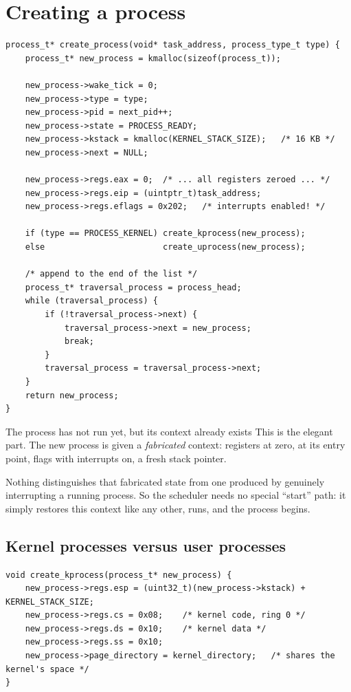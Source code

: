 \section{Creating a process}

\begin{lstlisting}[style=c]
process_t* create_process(void* task_address, process_type_t type) {
    process_t* new_process = kmalloc(sizeof(process_t));

    new_process->wake_tick = 0;
    new_process->type = type;
    new_process->pid = next_pid++;
    new_process->state = PROCESS_READY;
    new_process->kstack = kmalloc(KERNEL_STACK_SIZE);   /* 16 KB */
    new_process->next = NULL;

    new_process->regs.eax = 0;  /* ... all registers zeroed ... */
    new_process->regs.eip = (uintptr_t)task_address;
    new_process->regs.eflags = 0x202;   /* interrupts enabled! */

    if (type == PROCESS_KERNEL) create_kprocess(new_process);
    else                        create_uprocess(new_process);

    /* append to the end of the list */
    process_t* traversal_process = process_head;
    while (traversal_process) {
        if (!traversal_process->next) {
            traversal_process->next = new_process;
            break;
        }
        traversal_process = traversal_process->next;
    }
    return new_process;
}
\end{lstlisting}

\begin{concept}{The process has not run yet, but its context already exists}
This is the elegant part. The new process is given a \emph{fabricated} context: registers at zero,
 at its entry point, flags with interrupts on, a fresh stack pointer.

Nothing distinguishes that fabricated state from one produced by genuinely interrupting a running
process. So the scheduler needs no special ``start'' path: it simply restores this context like any
other,  runs, and the process begins. 
\end{concept}

\subsection{Kernel processes versus user processes}

\begin{lstlisting}[style=c]
void create_kprocess(process_t* new_process) {
    new_process->regs.esp = (uint32_t)(new_process->kstack) + KERNEL_STACK_SIZE;
    new_process->regs.cs = 0x08;    /* kernel code, ring 0 */
    new_process->regs.ds = 0x10;    /* kernel data */
    new_process->regs.ss = 0x10;
    new_process->page_directory = kernel_directory;   /* shares the kernel's space */
}
\end{lstlisting}

